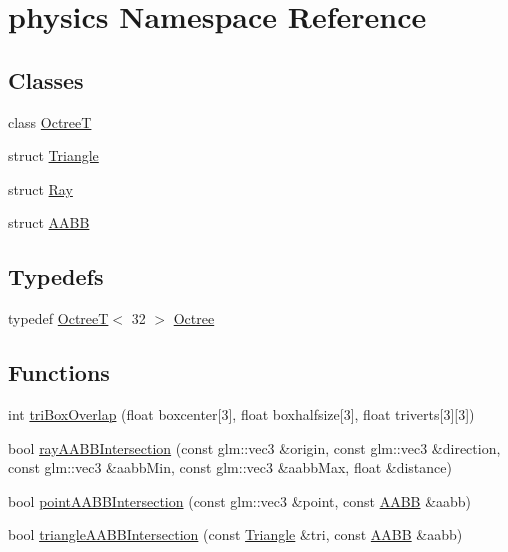 \hypertarget{namespacephysics}{\section{physics Namespace Reference}
\label{namespacephysics}
}
\subsection*{Classes}
\begin{DoxyCompactItemize}
\item 
class \hyperlink{classphysics_1_1OctreeT}{Octree\-T}
\item 
struct \hyperlink{structphysics_1_1Triangle}{Triangle}
\item 
struct \hyperlink{structphysics_1_1Ray}{Ray}
\item 
struct \hyperlink{structphysics_1_1AABB}{A\-A\-B\-B}
\end{DoxyCompactItemize}
\subsection*{Typedefs}
\begin{DoxyCompactItemize}
\item 
typedef \hyperlink{classphysics_1_1OctreeT}{Octree\-T}$<$ 32 $>$ \hyperlink{namespacephysics_a8031fb56deaac8c62e513678eb1ec44f}{Octree}
\end{DoxyCompactItemize}
\subsection*{Functions}
\begin{DoxyCompactItemize}
\item 
int \hyperlink{namespacephysics_aabbac609b8c26af03dc8e101c9742b05}{tri\-Box\-Overlap} (float boxcenter\mbox{[}3\mbox{]}, float boxhalfsize\mbox{[}3\mbox{]}, float triverts\mbox{[}3\mbox{]}\mbox{[}3\mbox{]})
\item 
bool \hyperlink{namespacephysics_aae58b7d55c6c5e327bda00f3130e7a8c}{ray\-A\-A\-B\-B\-Intersection} (const glm\-::vec3 \&origin, const glm\-::vec3 \&direction, const glm\-::vec3 \&aabb\-Min, const glm\-::vec3 \&aabb\-Max, float \&distance)
\item 
bool \hyperlink{namespacephysics_a9088f6fd30a49f806515a0b948cc109a}{point\-A\-A\-B\-B\-Intersection} (const glm\-::vec3 \&point, const \hyperlink{structphysics_1_1AABB}{A\-A\-B\-B} \&aabb)
\item 
bool \hyperlink{namespacephysics_aca4ebea6205d4a32acf45c9ee0a5ed8f}{triangle\-A\-A\-B\-B\-Intersection} (const \hyperlink{structphysics_1_1Triangle}{Triangle} \&tri, const \hyperlink{structphysics_1_1AABB}{A\-A\-B\-B} \&aabb)
\end{DoxyCompactItemize}


